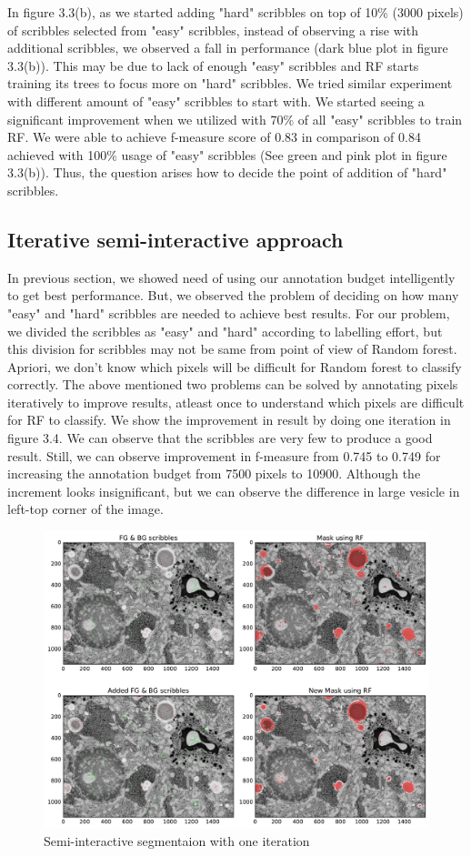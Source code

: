 In figure 3.3(b), as we started adding "hard" scribbles on top of 10\% (3000 pixels) of scribbles selected from "easy" scribbles, instead of observing a rise with additional scribbles, we observed a fall in performance (dark blue plot in figure 3.3(b)). This may be due to lack of enough "easy" scribbles and RF starts training its trees to focus more on "hard" scribbles. We tried similar experiment with different amount of "easy" scribbles to start with. We started seeing a significant improvement when we utilized with 70\% of all "easy" scribbles to train RF. We were able to achieve f-measure score of 0.83 in comparison of 0.84 achieved with 100\% usage of "easy" scribbles (See green and pink plot in figure 3.3(b)). Thus, the question arises how to decide the point of addition of "hard" scribbles. 

\subsection{Iterative semi-interactive approach}
In previous section, we showed need of using our annotation budget intelligently to get best performance. But, we observed the problem of deciding on how many "easy" and "hard" scribbles are needed to achieve best results. For our problem, we divided the scribbles as "easy" and "hard" according to labelling effort, but this division for scribbles may not be same from point of view of Random forest. Apriori, we don't know which pixels will be difficult for Random forest to classify correctly. The above mentioned two problems can be solved by annotating pixels iteratively to improve results, atleast once to understand which pixels are difficult for RF to classify. We show the improvement in result by doing one iteration in figure 3.4. We can observe that the scribbles are very few to produce a good result. Still, we can observe improvement in f-measure from 0.745 to 0.749 for increasing the annotation budget from 7500 pixels to 10900. Although the increment looks insignificant, but we can observe the difference in large vesicle in left-top corner of the image.
\begin{figure}[h!] \label{fig:semi-rf}
 \includegraphics[width=1.0\linewidth]{figures/semi_inter_rf.pdf}
\caption{Semi-interactive segmentaion with one iteration}
\end{figure}

